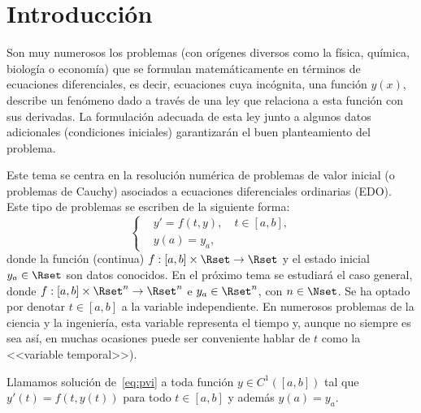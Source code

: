 \renewcommand{\tt}{t}
\newcommand{\yy}{y}
\newcommand{\yn}{{\yy_n}}
\newcommand{\ynn}{{\yy_{n+1}}}
\newcommand{\ta}{a}
\newcommand{\tb}{b}
\newcommand{\tn}{{\tt_n}}
\newcommand{\tnn}{{\tt_{n+1}}}
\newcommand{\zn}{{z_n}}
\newcommand{\znn}{{z_{n+1}}}
\newcommand{\ycero}{{y_a}}
\newcommand{\sol}{y}
\newcommand{\lipschitz}{$y$--Lipschitz\xspace}
\newcommand{\locLipschitz}{localmente \lipschitz}
\newcommand{\globLipschitz}{\lipschitz}
\newcommand{\errCons}{{\cal E}}
\newcommand{\RK}{Runge--Kutta\xspace}
\newcommand{\AB}{Adams--Bashforth\xspace}
\newcommand{\AM}{Adams--Moulton\xspace}


\section{Introducción}

Son muy numerosos los problemas (con orígenes diversos como la física,
química, biología o economía) que se formulan matemáticamente en
términos de ecuaciones diferenciales, es decir, ecuaciones cuya
incógnita, una función $y(x)$, describe un fenómeno dado a través de
una ley que relaciona a esta función con sus derivadas. La formulación
adecuada de esta ley junto a algunos datos adicionales (condiciones
iniciales) garantizarán el buen planteamiento del problema.

Este tema se centra en la resolución numérica de problemas de valor
inicial (o problemas de Cauchy) asociados a ecuaciones diferenciales
ordinarias (EDO). Este tipo de problemas se escriben de la siguiente
forma:
\begin{equation}
  \label{eq:pvi}
  \tag{PVI}
  \left\{
  \begin{aligned}
    &y' = f(\tt,\yy), \quad \tt\in[\ta,\tb],
    \\
    &y(\ta) = \ycero,
  \end{aligned}
  \right.
\end{equation}
donde la función (continua) $f:[\ta,\tb]\times\Rset\to\Rset$ y el
estado inicial $\ycero\in\Rset$ son datos conocidos. En el próximo
tema se estudiará el caso general, donde
$f:[\ta,\tb]\times\Rset^n\to\Rset^n$ e $\ycero\in\Rset^n$, con
$n\in\Nset$. Se ha optado por denotar $t\in [a,b]$ a la variable
independiente.  En numerosos problemas de la ciencia y la ingeniería,
esta variable representa el tiempo y, aunque no siempre es
sea así, en muchas ocasiones puede ser conveniente
hablar de $\tt$ como la <<variable temporal>>).

\begin{definition}
  \label{def:sol-pvi}
  Llamamos solución de~\eqref{eq:pvi} a toda función $\sol\in
  C^1([\ta,\tb])$ tal que $\sol'(\tt)=f(\tt,\sol(\tt))$ para todo
  $\tt\in[\ta,\tb]$ y además $\sol(\ta)=\ycero$.\label{def:3}
\end{definition}

